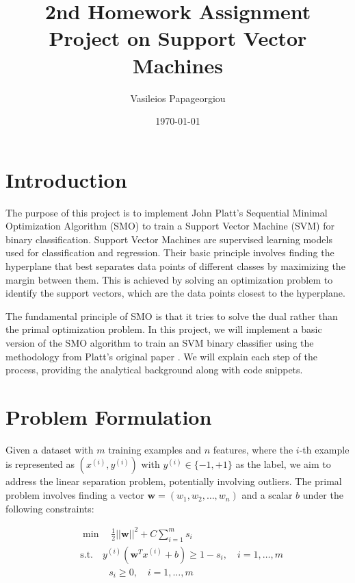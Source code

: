 \documentclass[10pt,a4paper]{article}
\title{2nd Homework Assignment \\ \huge{Project on Support Vector Machines}}
\author{Vasileios Papageorgiou}
\date{\today}
\newcounter{para}
\begin{document}
	\maketitle
	\thispagestyle{fancy}
	




\section{Introduction}
\label{sec:intro}
The purpose of this project is to implement John Platt’s Sequential Minimal Optimization Algorithm (SMO) to train a Support Vector Machine (SVM) for binary classification. Support Vector Machines are supervised learning models used for classification and regression. Their basic principle involves finding the hyperplane that best separates data points of different classes by maximizing the margin between them. This is achieved by solving an optimization problem to identify the support vectors, which are the data points closest to the hyperplane.

The fundamental principle of SMO is that it tries to solve the dual rather than the primal optimization problem. In this project, we will implement a basic version of the SMO algorithm to train an SVM binary classifier using the methodology from Platt's original paper \cite{platt1998sequential}. We will explain each step of the process, providing the analytical background along with code snippets.

\section{Problem Formulation}
\label{sec:problem}

Given a dataset with \( m \) training examples and \( n \) features, where the \( i \)-th example is represented as \( (x^{(i)}, y^{(i)}) \) with \( y^{(i)} \in \{-1, +1\} \) as the label, we aim to address the linear separation problem, potentially involving outliers. The primal problem involves finding a vector \( \mathbf{w} = (w_1, w_2, \ldots, w_n) \) and a scalar \( b \) under the following constraints:

\[
\begin{aligned}
	& \min \quad \frac{1}{2} ||\mathbf{w}||^2 + C \sum_{i=1}^{m} s_i \\
	& \text{s.t.} \quad y^{(i)} (\mathbf{w}^T x^{(i)} + b) \geq 1 - s_i, \quad i = 1, \ldots, m \\
	& \quad \quad \quad s_i \geq 0, \quad i = 1, \ldots, m
\end{aligned}
\]
\end{document}
